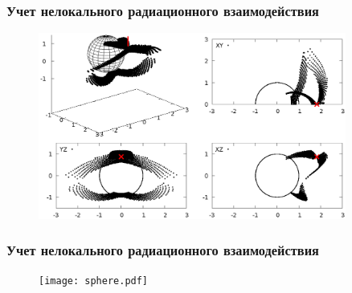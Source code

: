 \documentclass{beamer}
\begin{document}
\begin{frame}
\frametitle{Учет нелокального радиационного взаимодействия}
\begin{figure}[h]
\centering
\includegraphics[width=0.9\textwidth]{surf.eps}
\end{figure}

\end{frame}

\begin{frame}
\frametitle{Учет нелокального радиационного взаимодействия}
\begin{figure}
\centering
\texttt{[image: sphere.pdf]}
\end{figure}
\end{frame}


\end{document}
